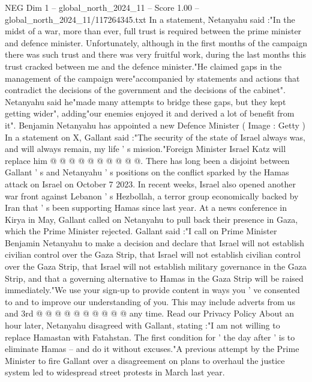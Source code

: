 \begin{textsample}{NEG Dim 1 – global\_north\_2024\_11 – Score 1.00 – global\_north\_2024\_11/117264345.txt}  \label{ex:f1_neg_116}
In a statement, Netanyahu said :"In the midst of a war, more than ever, full trust is required between the prime minister and defence minister.
Unfortunately, although in the first months of the campaign there was such trust and there was very fruitful work, during the last months this trust cracked between me and the defence minister."He claimed gaps in the management of the campaign were"accompanied by statements and actions that contradict the decisions of the government and the decisions of the cabinet".
Netanyahu said he"made many attempts to bridge these gaps, but they kept getting wider", adding"our enemies enjoyed it and derived a lot of benefit from it".
Benjamin Netanyahu has appointed a new Defence Minister ( Image : Getty ) In a statement on X, Gallant said :"The security of the state of Israel always was, and will always remain, my life ' s mission."Foreign Minister Israel Katz will replace him @ @ @ @ @ @ @ @ @ @.
There has long been a disjoint between Gallant ' s and Netanyahu ' s positions on the conflict sparked by the Hamas attack on Israel on October 7 2023.
In recent weeks, Israel also opened another war front against Lebanon ' s Hezbollah, a terror group economically backed by Iran that ' s been supporting Hamas since last year.
At a news conference in Kirya in May, Gallant called on Netanyahu to pull back their presence in Gaza, which the Prime Minister rejected.
Gallant said :"I call on Prime Minister Benjamin Netanyahu to make a decision and declare that Israel will not establish civilian control over the Gaza Strip, that Israel will not establish civilian control over the Gaza Strip, that Israel will not establish military governance in the Gaza Strip, and that a governing alternative to Hamas in the Gaza Strip will be raised immediately."We use your sign-up to provide content in ways you ' ve consented to and to improve our understanding of you.
This may include adverts from us and 3rd @ @ @ @ @ @ @ @ @ @ any time.
Read our Privacy Policy About an hour later, Netanyahu disagreed with Gallant, stating :"I am not willing to replace Hamastan with Fatahstan.
The first condition for ' the day after ' is to eliminate Hamas -- and do it without excuses."A previous attempt by the Prime Minister to fire Gallant over a disagreement on plans to overhaul the justice system led to widespread street protests in March last year.

\end{textsample}
